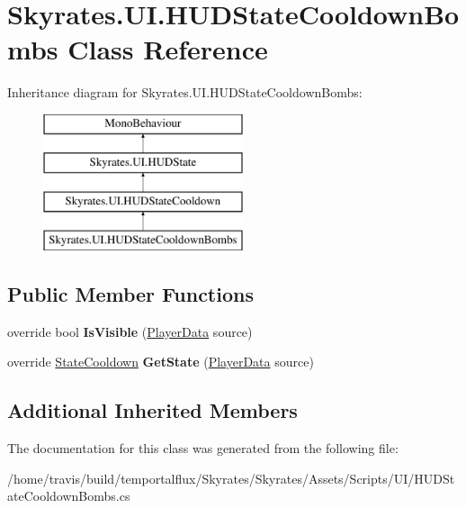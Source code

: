 \hypertarget{class_skyrates_1_1_u_i_1_1_h_u_d_state_cooldown_bombs}{\section{Skyrates.\-U\-I.\-H\-U\-D\-State\-Cooldown\-Bombs Class Reference}
\label{class_skyrates_1_1_u_i_1_1_h_u_d_state_cooldown_bombs}
}
Inheritance diagram for Skyrates.\-U\-I.\-H\-U\-D\-State\-Cooldown\-Bombs\-:\begin{figure}[H]
\begin{center}
\leavevmode
\includegraphics[height=4.000000cm]{class_skyrates_1_1_u_i_1_1_h_u_d_state_cooldown_bombs}
\end{center}
\end{figure}
\subsection*{Public Member Functions}
\begin{DoxyCompactItemize}
\item 
\hypertarget{class_skyrates_1_1_u_i_1_1_h_u_d_state_cooldown_bombs_a384a95e783074f2b7287a4d3bd2290a7}{override bool {\bfseries Is\-Visible} (\hyperlink{class_skyrates_1_1_data_1_1_player_data}{Player\-Data} source)}\label{class_skyrates_1_1_u_i_1_1_h_u_d_state_cooldown_bombs_a384a95e783074f2b7287a4d3bd2290a7}

\item 
\hypertarget{class_skyrates_1_1_u_i_1_1_h_u_d_state_cooldown_bombs_a8b34517627d43af1e4317af791adbd09}{override \hyperlink{class_skyrates_1_1_misc_1_1_state_cooldown}{State\-Cooldown} {\bfseries Get\-State} (\hyperlink{class_skyrates_1_1_data_1_1_player_data}{Player\-Data} source)}\label{class_skyrates_1_1_u_i_1_1_h_u_d_state_cooldown_bombs_a8b34517627d43af1e4317af791adbd09}

\end{DoxyCompactItemize}
\subsection*{Additional Inherited Members}


The documentation for this class was generated from the following file\-:\begin{DoxyCompactItemize}
\item 
/home/travis/build/temportalflux/\-Skyrates/\-Skyrates/\-Assets/\-Scripts/\-U\-I/H\-U\-D\-State\-Cooldown\-Bombs.\-cs\end{DoxyCompactItemize}
